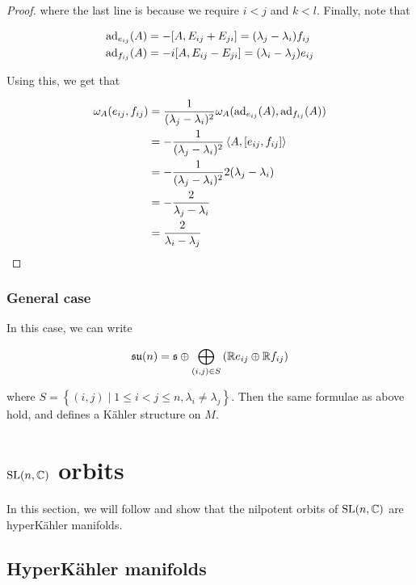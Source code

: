 \documentclass{report}
\newcommand{\su}{\mathfrak{su}}
\begin{document}
\begin{proof}
where the last line is because we require \(i < j\) and \(k < l\). Finally, note that

\begin{align*}
    \operatorname{ad}_{e_{ij}}(A) &= -[A, E_{ij} + E_{ji}] = (\lambda_j - \lambda_i)f_{ij} \\
    \operatorname{ad}_{f_{ij}}(A) &= -i[A, E_{ij} - E_{ji}] = (\lambda_i - \lambda_j)e_{ij}
\end{align*}

Using this, we get that

\begin{align*}
    \omega_A(e_{ij}, f_{ij}) &= \frac{1}{(\lambda_j - \lambda_i)^2}\omega_A(\operatorname{ad}_{e_{ij}}(A), \operatorname{ad}_{f_{ij}}(A)) \\
    &= -\frac{1}{(\lambda_j - \lambda_i)^2}\left\langle A, [e_{ij}, f_{ij}] \right\rangle \\
    &= -\frac{1}{(\lambda_j - \lambda_i)^2}2(\lambda_j - \lambda_i) \\
    &= -\frac{2}{\lambda_j - \lambda_i} \\
    &= \frac{2}{\lambda_i - \lambda_j}
\end{align*}

\end{proof}

\subsection{General case}

In this case, we can write

\[\su(n) = \mfs \oplus \bigoplus_{(i, j) \in S}\left(\R e_{ij} \oplus \R f_{ij}\right)\]

where \(S = \left\{(i, j) \mid 1 \le i < j \le n, \lambda_i \ne \lambda_j\right\}\). Then the same formulae as above hold, and defines a K\"ahler structure on \(M\). 

\chapter{\(\operatorname{SL}(n, \mathbb{C})\) orbits}

In this section, we will follow \cite{kobak_classical_1996} and show that the nilpotent orbits of \(\operatorname{SL}(n, \mathbb{C})\) are hyperK\"ahler manifolds.

\section{HyperK\"ahler manifolds}
\end{document}
